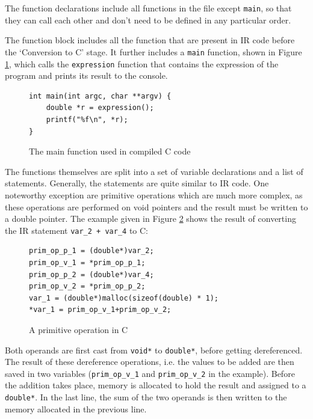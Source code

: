 \documentclass[11pt]{report}
\begin{document}
The function declarations include all functions in the file except \texttt{main}, so that they can call each other and don't need to be defined in any particular order.

The function block includes all the function that are present in IR code before the `Conversion to C' stage. It further includes a \texttt{main} function, shown in Figure \ref{icmm5}, which calls the \texttt{expression} function that contains the expression of the program and prints its result to the console.

\begin{figure}[ht]
\begin{lstlisting}
int main(int argc, char **argv) {
    double *r = expression();
    printf("%f\n", *r);
}
\end{lstlisting}
\caption{The main function used in compiled C code}
\label{icmm5}
\end{figure}

The functions themselves are split into a set of variable declarations and a list of statements. Generally, the statements are quite similar to IR code. One noteworthy exception are primitive operations which are much more complex, as these operations are performed on void pointers and the result must be written to a double pointer. The example given in Figure \ref{icmm6} shows the result of converting the IR statement \texttt{var_2 + var_4} to C:

\begin{figure}[ht]
\begin{lstlisting}
prim_op_p_1 = (double*)var_2;
prim_op_v_1 = *prim_op_p_1;
prim_op_p_2 = (double*)var_4;
prim_op_v_2 = *prim_op_p_2;
var_1 = (double*)malloc(sizeof(double) * 1);
*var_1 = prim_op_v_1+prim_op_v_2;
\end{lstlisting}
\caption{A primitive operation in C}
\label{icmm6}
\end{figure}

Both operands are first cast from \texttt{void*} to \texttt{double*}, before getting dereferenced. The result of these dereference operations, i.e. the values to be added are then saved in two variables (\texttt{prim_op_v_1} and \texttt{prim_op_v_2} in the example). Before the addition takes place, memory is allocated to hold the result and assigned to a \texttt{double*}. In the last line, the sum of the two operands is then written to the memory allocated in the previous line.
\end{document}
